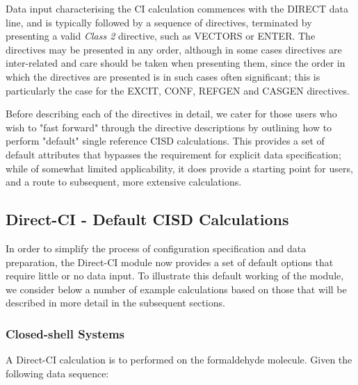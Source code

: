 \documentclass[11pt,fleqn]{article}
\begin{document}
Data input characterising the CI calculation commences with the DIRECT
data line, and is typically followed by a sequence of directives,
terminated by presenting a valid {\em Class 2} directive, such as VECTORS
or ENTER.  The directives may be presented in any order, although in
some  cases directives are inter-related and care should be taken when
presenting them, since the order in which the directives are presented
is in such cases often significant; this is particularly the case for
the EXCIT, CONF, REFGEN and CASGEN directives.

Before describing each of the directives in detail, we cater for those
users who wish to "fast forward" through the directive descriptions by
outlining how to perform "default" single reference CISD calculations.
This provides a set of default attributes that bypasses the requirement
for explicit data specification; while of somewhat limited
applicability, it does provide a starting point for users, and a route
to subsequent, more extensive calculations.

\subsection[Direct-CI - Default CISD Calculations]{Direct-CI - Default CISD Calculations}

In order to simplify the process of configuration specification and
data preparation, the Direct-CI module now provides a set of default
options that require little or no data input.  To illustrate this
default working of the module, we consider below a number of example
calculations based on those that will be described in more detail in
the subsequent sections.

\subsubsection{Closed-shell Systems}

A Direct-CI calculation is to performed on the formaldehyde molecule.
Given the following data sequence:
\end{document}
